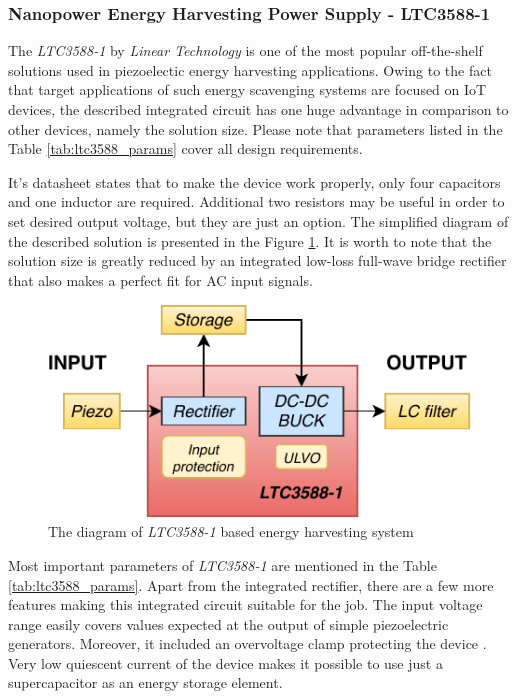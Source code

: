 \documentclass[12pt,a4paper]{article}
\begin{document}
\subsubsection{Nanopower Energy Harvesting Power Supply - LTC3588-1}
The \textit{LTC3588-1} by \textit{Linear Technology} is one of the most popular off-the-shelf solutions used in piezoelectic energy harvesting applications. Owing to the fact that target applications of such energy scavenging systems are focused on IoT devices, the described integrated circuit has one huge advantage in comparison to other devices, namely the solution size. Please note that parameters listed in the Table \ref{tab:ltc3588_params} cover all design requirements.
\par
It's datasheet \cite{ltc3588_params} states that to make the device work properly, only four capacitors and one inductor are required. Additional two resistors may be useful in order to set desired output voltage, but they are just an option. The simplified diagram of the described solution is presented in the Figure \ref{fig:ltc3588diagram}. It is worth to note that the solution size is greatly reduced by an integrated low-loss full-wave bridge rectifier that also makes a perfect fit for AC input signals.

\begin{figure}[ht!]
\includegraphics[scale=1.2]{LTC3588.pdf}
\caption{The diagram of \textit{LTC3588-1} based energy harvesting system}
\label{fig:ltc3588diagram}
\end{figure}

\par

Most important parameters of \textit{LTC3588-1} are mentioned in the Table \ref{tab:ltc3588_params}. Apart from the integrated rectifier, there are a few more features making this integrated circuit suitable for the job.  The input voltage range easily covers values expected at the output of simple piezoelectric generators. Moreover, it included an overvoltage clamp protecting the device \cite{ltc3588_params}. Very low quiescent current of the device makes it possible to use just a supercapacitor as an energy storage element.
\end{document}
